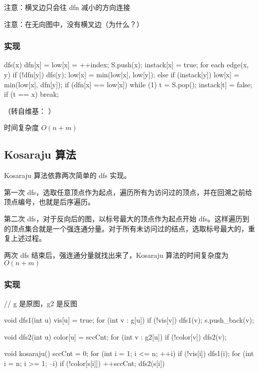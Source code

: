 注意：横叉边只会往 dfn 减小的方向连接

注意：在无向图中，没有横叉边（为什么？）

\subsubsection{实现}

\begin{cppcode}
dfs(x) {
  dfn[x] = low[x] = ++index;
  S.push(x);
  instack[x] = true;
    for
      each edge(x, y) {
        if (!dfn[y]) {
          dfs(y);
          low[x] = min(low[x], low[y]);
        } else if (instack[y]) {
          low[x] = min(low[x], dfn[y]);
        }
      }
    if (dfn[x] == low[x]) {
      while (1) {
        t = S.pop();
        instack[t] = false;
        if (t == x) break;
      }
    }
}
\end{cppcode}

（转自维基：\href{https://en.wikipedia.org/wiki/Tarjan%27s_strongly_connected_components_algorithm}{} ）

时间复杂度 $O(n + m)$

\subsection{Kosaraju 算法}

Kosaraju 算法依靠两次简单的 dfs 实现。

第一次 dfs，选取任意顶点作为起点，遍历所有为访问过的顶点，并在回溯之前给顶点编号，也就是后序遍历。

第二次 dfs，对于反向后的图，以标号最大的顶点作为起点开始 dfs。这样遍历到的顶点集合就是一个强连通分量。对于所有未访问过的结点，选取标号最大的，重复上述过程。

两次 dfs 结束后，强连通分量就找出来了，Kosaraju 算法的时间复杂度为 $O(n+m)$

\subsubsection{实现}

\begin{cppcode}
// g 是原图，g2 是反图

void dfs1(int u) {
  vis[u] = true;
  for (int v : g[u])
    if (!vis[v]) dfs1(v);
  s.push_back(v);
}

void dfs2(int u) {
  color[u] = sccCnt;
  for (int v : g2[u])
    if (!color[v]) dfs2(v);
}

void kosaraju() {
  sccCnt = 0;
  for (int i = 1; i <= n; ++i)
    if (!vis[i]) dfs1(i);
  for (int i = n; i >= 1; --i)
    if (!color[s[i]]) {
      ++sccCnt;
      dfs2(s[i])
    }
}
\end{cppcode}

